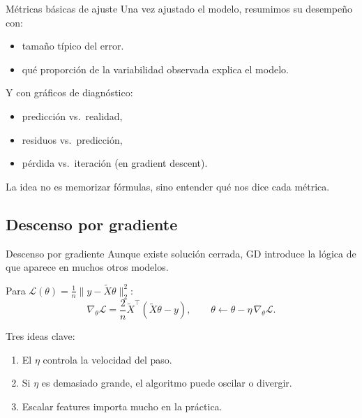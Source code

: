 \begin{frame}{Métricas básicas de ajuste}
Una vez ajustado el modelo, resumimos su desempeño con:
\begin{itemize}\small
  \item {} tamaño típico del error.
  \item {} qué proporción de la variabilidad observada explica el modelo.
\end{itemize}

\vspace{0.3em}
Y con gráficos de diagnóstico:
\begin{itemize}\footnotesize
  \item predicción vs.\ realidad,
  \item residuos vs.\ predicción,
  \item pérdida vs.\ iteración (en gradient descent).
\end{itemize}

\vspace{0.2em}
{\footnotesize La idea no es memorizar fórmulas, sino entender qué nos dice cada métrica.}
\end{frame}

\subsection{Descenso por gradiente}

\begin{frame}{Descenso por gradiente}
Aunque existe solución cerrada, GD introduce la lógica de  que aparece en muchos otros modelos.

\vspace{0.2em}
Para $\mathcal{L}(\theta)=\frac1n\|y-\tilde X\theta\|_2^2$:
\[
\nabla_\theta \mathcal{L}=\frac{2}{n}\tilde X^\top(\tilde X\theta-y),
\qquad
\theta \leftarrow \theta - \eta\,\nabla_\theta\mathcal{L}.
\]

\vspace{0.2em}
Tres ideas clave:
\begin{enumerate}\footnotesize
  \item El  $\eta$ controla la velocidad del paso.
  \item Si $\eta$ es demasiado grande, el algoritmo puede oscilar o divergir.
  \item Escalar features importa mucho en la práctica.
\end{enumerate}
\end{frame}

